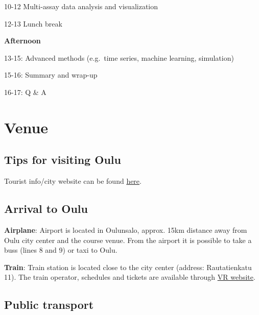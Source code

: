 \documentclass[
  oneside]{book}
\begin{document}
10-12 Multi-assay data analysis and visualization

12-13 Lunch break

\textbf{Afternoon}

13-15: Advanced methods (e.g.~time series, machine learning, simulation)

15-16: Summary and wrap-up

16-17: Q \& A

\hypertarget{venue}{%
\chapter{Venue}\label{venue}}

\hypertarget{tips-for-visiting-oulu}{%
\section{Tips for visiting Oulu}\label{tips-for-visiting-oulu}}

Tourist info/city website can be found \href{https://visitoulu.fi/en/}{here}.

\hypertarget{arrival-to-oulu}{%
\section{Arrival to Oulu}\label{arrival-to-oulu}}

\textbf{Airplane}: Airport is located in Oulunsalo, approx. 15km distance away from
Oulu city center and the course venue. From the airport it is possible to take
a buss (lines 8 and 9) or taxi to Oulu.

\textbf{Train}: Train station is located close to the city center (address:
Rautatienkatu 11). The train operator, schedules and tickets are available
through \href{https://www.vr.fi/en}{VR website}.

\hypertarget{public-transport}{%
\section{Public transport}\label{public-transport}}
\end{document}
